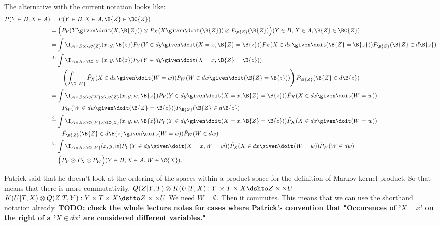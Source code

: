 The alternative with the current notation looks like:
\begin{align*}
  P(Y \in B, X \in A)
  &= P(Y \in B, X \in A, \B{Z} \in \BC{Z}) \\
  &= \Big(P_Y(Y \given \doit(X,\B{Z})) \otimes P_X(X \given \doit(\B{Z})) \otimes P_{\B{Z}}(\B{Z})\Big)(Y \in B, X \in A, \B{Z} \in \BC{Z}) \\
  &= \int \I_{A\times B \times \BC{Z}}(x,y,\B{z}) P_Y(Y \in dy \given \doit(X=x,\B{Z}=\B{z})) P_X(X \in dx \given \doit(\B{Z}=\B{z})) P_{\B{Z}}(\B{Z} \in d\B{z}) \\
  &\stackrel{1.}{=} \int \I_{A\times B \times \BC{Z}}(x,y,\B{z}) P_Y(Y \in dy \given \doit(X=x,\B{Z}=\B{z})) \\
   & \qquad \left( \int_{\C{W}} \tilde{P}_X(X \in dx \given \doit(W=w)) P_W(W \in dw \given \doit(\B{Z}=\B{z})) \right) P_{\B{Z}}(\B{Z} \in d\B{z}) \\
  &= \int \I_{A\times B \times \C{W} \times \BC{Z}}(x,y,w,\B{z}) P_Y(Y \in dy \given \doit(X=x,\B{Z}=\B{z})) \tilde{P}_X(X \in dx \given \doit(W=w)) \\
   & \qquad P_W(W \in dw \given \doit(\B{Z}=\B{z})) P_{\B{Z}}(\B{Z} \in d\B{z}) \\
  &\stackrel{2.}{=} \int \I_{A\times B \times \C{W} \times \BC{Z}}(x,y,w,\B{z}) P_Y(Y \in dy \given \doit(X=x,\B{Z}=\B{z})) \tilde{P}_X(X \in dx \given \doit(W=w)) \\
   & \qquad \tilde{P}_{\B{Z}}(\B{Z} \in d\B{z} \given \doit(W=w)) \tilde{P}_W(W \in dw) \\
  &\stackrel{3.}{=} \int \I_{A\times B \times \C{W}}(x,y,w) \tilde{P}_Y(Y \in dy \given \doit(X=x,W=w)) \tilde{P}_X(X \in dx \given \doit(W=w)) \tilde{P}_W(W \in dw) \\
  &= \Big(\tilde{P}_Y \otimes \tilde{P}_X \otimes \tilde{P}_W\Big)(Y \in B, X \in A, W \in \C{X}).
\end{align*}

Patrick said that he doesn't look at the ordering of the spaces within a product space for the definition of Markov kernel product. So that means that there is more commutativity. 
$Q(Z|Y,T) \otimes K(U|T,X) : Y \times T \times X \dshto Z \times \times U$
$K(U|T,X) \otimes Q(Z|T,Y) : Y \times T \times X \dshto Z \times \times U$
We need $W = \emptyset$. Then it commutes.
This means that we can use the shorthand notation already.
\textbf{TODO: check the whole lecture notes for cases where Patrick's convention that "Occurences of '$X=x$' on the right of a '$X \in dx$' are considered different variables."}

